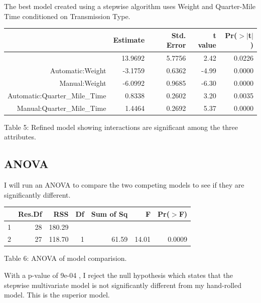 \documentclass{article}
\begin{document}
{The best model created using a stepwise algorithm uses Weight and Quarter-Mile Time conditioned on Transmission Type.


\begin{center}
\begin{minipage}{0.65\textwidth} 
\begin{tabular}{rrrrr}
  \hline
 & Estimate & Std. Error & t value & Pr($>$$|$t$|$) \\ 
  \hline
[Intercept] & 13.9692 & 5.7756 & 2.42 & 0.0226 \\ 
  Automatic:Weight & -3.1759 & 0.6362 & -4.99 & 0.0000 \\ 
  Manual:Weight & -6.0992 & 0.9685 & -6.30 & 0.0000 \\ 
  Automatic:Quarter\_Mile\_Time & 0.8338 & 0.2602 & 3.20 & 0.0035 \\ 
  Manual:Quarter\_Mile\_Time & 1.4464 & 0.2692 & 5.37 & 0.0000 \\ 
   \hline
\end{tabular}
Table 5: Refined model showing interactions are significant among the three attributes.
\end{minipage} 
\end{center}


\subsection{ANOVA}
I will run an ANOVA to compare the two competing models to see if they are significantly different.

\begin{center}
\begin{minipage}{0.5\textwidth} 
\begin{tabular}{lrrrrrr}
  \hline
 & Res.Df & RSS & Df & Sum of Sq & F & Pr($>$F) \\ 
  \hline
1 & 28 & 180.29 &  &  &  &  \\ 
  2 & 27 & 118.70 & 1 & 61.59 & 14.01 & 0.0009 \\ 
   \hline
\end{tabular}
Table 6: ANOVA of model comparision.
\end{minipage}
\end{center}


With a p-value of 9e-04 , I reject the null hypothesis which states that the stepwise multivariate model is not significantly different from my hand-rolled model. This is the superior model. 

}
\end{document}
